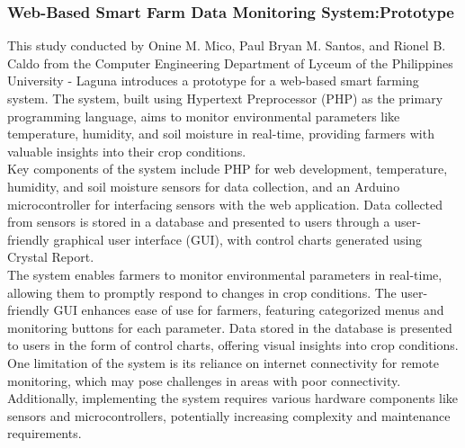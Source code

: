 \documentclass[12pt, a4paper]{article}
\begin{document}
\subsubsection{Web-Based Smart Farm Data Monitoring System:Prototype}
This study conducted by Onine M. Mico, Paul Bryan M. Santos, and Rionel B. Caldo \cite{mico2016web} from the Computer Engineering Department of Lyceum of the Philippines University - Laguna introduces a prototype for a web-based smart farming system. The system, built using Hypertext Preprocessor (PHP) as the primary programming language, aims to monitor environmental parameters like temperature, humidity, and soil moisture in real-time, providing farmers with valuable insights into their crop conditions.\\
Key components of the system include PHP for web development, temperature, humidity, and soil moisture sensors for data collection, and an Arduino microcontroller for interfacing sensors with the web application. Data collected from sensors is stored in a database and presented to users through a user-friendly graphical user interface (GUI), with control charts generated using Crystal Report.\\
The system enables farmers to monitor environmental parameters in real-time, allowing them to promptly respond to changes in crop conditions. The user-friendly GUI enhances ease of use for farmers, featuring categorized menus and monitoring buttons for each parameter. Data stored in the database is presented to users in the form of control charts, offering visual insights into crop conditions.\\
One limitation of the system is its reliance on internet connectivity for remote monitoring, which may pose challenges in areas with poor connectivity. Additionally, implementing the system requires various hardware components like sensors and microcontrollers, potentially increasing complexity and maintenance requirements.
\end{document}
